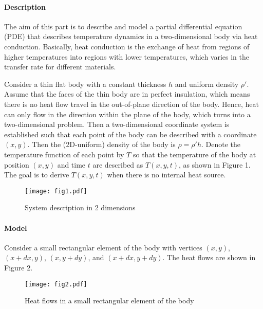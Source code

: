 

\paragraph{Description}
The aim of this part is to describe and model a partial differential equation (PDE) that describes temperature dynamics in a two-dimensional body via heat conduction.
Basically, heat conduction is the exchange of heat from regions of higher temperatures into regions with lower temperatures, which varies in the transfer rate for different materials.

Consider a thin flat body with a constant thickness $h$ and uniform density $\rho'$. Assume that the faces of the thin body are in perfect insulation, which means there is no heat flow travel in the out-of-plane direction of the body. Hence, heat can only flow in the direction within the plane of the body, which turns into a two-dimensional problem. Then a two-dimensional coordinate system is established such that each point of the body can be described with a coordinate $(x,y)$. Then the (2D-uniform) density of the body is $\rho = \rho' h$. Denote the temperature function of each point by $T$ so that the temperature of the body at position $(x,y)$ and time $t$ are described as $T(x,y,t)$, as shown in Figure 1. The goal is to derive $T(x,y,t)$ when there is no internal heat source.

\begin{figure}[htb]
	\centering
	\texttt{[image: fig1.pdf]}       
	\caption{System description in 2 dimensions}\label{heatElement.fig}
\end{figure}

\paragraph{Model}
Consider a small rectangular element of the body with vertices $(x,y)$, $(x+dx,y)$, $(x, y+dy)$, and $(x+dx, y+dy)$. The heat flows are shown in Figure 2.
\begin{figure}[htb]
	\centering
	\texttt{[image: fig2.pdf]}       
	\caption{Heat flows in a small rectangular element of the body}
\end{figure}

